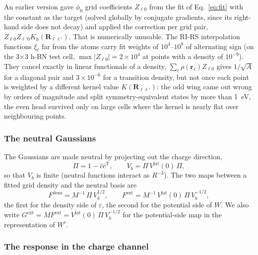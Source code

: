 \documentclass[%
 reprint,
superscriptaddress,
 amsmath,amssymb,
 aps,
prb,
]{revtex4-2}
\newcommand{\br}{\mathbf{r}}
\newcommand{\bR}{\mathbf{R}}
\newcommand{\Tr}{\mathrm{T}}
\newcommand{\head}{\mathrm{h}}
\newcommand{\lat}{\mathrm{lat}}
\newcommand{\dens}{\mathrm{dens}}
\newcommand{\ext}{\mathrm{ext}}
\begin{document}
An earlier version gave $\phi_0$ grid coefficients $Z_{\ell0}$ from the fit of
Eq.~\eqref{eq:fit} with the constant as the target (solved globally by conjugate gradients, since
its right-hand side does not decay) and applied the correction per grid pair,
$Z_{\ell0}Z_{\ell'0}K_\head(\bR_{\ell\ell'})$. That is numerically unusable. The RI-RS
interpolation functions $\xi_\ell$ far from the atoms carry fit weights of $10^4$--$10^8$ of
alternating sign (on the 3$\times$3 h-BN test cell, $\max|Z_{\ell0}| = 2\times10^4$ at points
with a density of $10^{-9}$). They cancel exactly in linear functionals of a density,
$\sum_\ell\rho(\br_\ell)Z_{\ell0}$ gives $1/\sqrt A$ for a diagonal pair and $3\times10^{-6}$
for a transition density, but not once each point is weighted by a different kernel value
$K(\bR_{\ell\ell'})$: the odd wing came out wrong by orders of magnitude and split
symmetry-equivalent states by more than 1~eV, the even head survived only on large cells where
the kernel is nearly flat over neighbouring points.

\subsubsection{The neutral Gaussians}
\label{sec:neutral}

The Gaussians are made neutral by projecting out the charge direction,
\begin{equation}
  \Pi = 1 - \hat c\hat c^\Tr,\qquad V_b = \Pi\, V^\lat(0)\,\Pi ,
  \label{eq:Pi}
\end{equation}
so that $V_b$ is finite (neutral functions interact as $R^{-3}$). The two maps between a fitted
grid density and the neutral basis are
\begin{equation}
  F^\dens = M^{-1}\,\Pi\, V_b^{1/2},\qquad
  F^\ext = M^{-1}\, V^\lat(0)\,\Pi\, V_b^{-1/2},
  \label{eq:F}
\end{equation}
the first for the density side of $\varepsilon$, the second for the potential side of $W$. We
also write $G^\ext = M F^\ext = V^\lat(0)\,\Pi\,V_b^{-1/2}$ for the potential-side map in the
representation of $W^c$.

\subsubsection{The response in the charge channel}
\label{sec:response}
\end{document}

